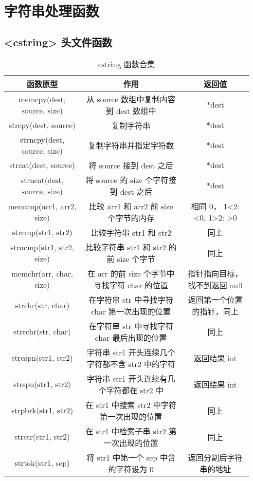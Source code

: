 \section{字符串处理函数}
\subsection{<cstring> 头文件函数}
\begin{table}[h]
\centering
\small
\begin{tabular}{|c|c|c|}
\hline 函数原型 & 作用 & 返回值 \\
\hline memcpy(dest, source, size) & 从 source 数组中复制内容到 dest 数组中 & *dest \\
\hline strcpy(dest, source) & 复制字符串 & *dest \\
\hline strncpy(dest, source, size) & 复制字符串并指定字符数 & *dest \\
\hline strcat(dest, source) & 将 source 接到 dest 之后 & *dest \\
\hline strncat(dest, source, size) & 将 source 的 size 个字符接到 dest 之后 & *dest \\
\hline memcmp(arr1, arr2, size) & 比较 arr1 和 arr2 前 size 个字节的内存 & 相同 0， 1<2: <0, 1>2: >0 \\
\hline strcmp(str1, str2) & 比较字符串 str1 和 str2 & 同上 \\
\hline strncmp(str1, str2, size) & 比较字符串 str1 和 str2 的前 size 个字节 & 同上 \\
\hline memchr(arr, char, size) & 在 arr 的前 size 个字节中寻找字符 char 的位置 & 指针指向目标，找不到返回 null \\
\hline strchr(str, char) & 在字符串 str 中寻找字符 char 第一次出现的位置 & 返回第一个位置的指针，同上 \\
\hline strrchr(str, char) & 在字符串 str 中寻找字符 char 最后出现的位置 & 同上 \\
\hline strcspn(str1, str2) &  字符串 str1 开头连续几个字符都不含 str2 中的字符 & 返回结果 int \\
\hline strspn(str1, str2) & 字符串 str1 开头连续有几个字符都在 str2 中 & 返回结果 int \\
\hline strpbrk(str1, str2) & 在 str1 中搜索 str2 中字符第一次出现的位置 & 同上 \\
\hline strstr(str1, str2) & 在 str1 中检索子串 str2 第一次出现的位置 & 同上 \\
\hline strtok(str1, sep) & 将 str1 中第一个 sep 中含的字符设为 0 & 返回分割后字符串的地址 \\
\hline
\end{tabular}
\caption{cstring 函数合集}
\label{tab:Margin_settings}
\end{table}

